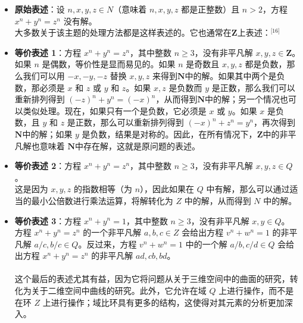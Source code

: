 \begin{itemize}
\item \textbf{原始表述}：设 \( n, x, y, z \in N \)（意味着 \( n, x, y, z \) 都是正整数）且 \( n > 2 \)，方程 \( x^n + y^n = z^n \) 没有解。\\  
大多数关于该主题的处理方法都是这样表述的。它也通常在\( \mathbf{Z} \)上表述：\(^\text{[16]}\)
\item \textbf{等价表述 1}：方程 \( x^n + y^n = z^n \)，其中整数 \( n \geq 3 \)，没有非平凡解 \( x, y, z \in \mathbf{Z} \)。\\  
如果 \( n \) 是偶数，等价性是显而易见的。如果 \( n \) 是奇数且 \( x, y, z \) 都是负数，那么我们可以用 \( -x, -y, -z \) 替换 \( x, y, z \) 来得到\( \mathbf{N} \)中的解。如果其中两个是负数，那必须是 \( x \) 和 \( z \) 或 \( y \) 和 \( z \)。如果 \( x, z \) 是负数而 \( y \) 是正数，那么我们可以重新排列得到 \( (-z)^n + y^n = (-x)^n \)，从而得到\( \mathbf{N} \)中的解；另一个情况也可以类似处理。现在，如果只有一个是负数，它必须是 \( x \) 或 \( y \)。如果 \( x \) 是负数，且 \( y \) 和 \( z \) 是正数，那么可以重新排列得到 \( (-x)^n + z^n = y^n \)，再次得到\( \mathbf{N} \)中的解；如果 \( y \) 是负数，结果是对称的。因此，在所有情况下，\( \mathbf{Z} \)中的非平凡解也意味着 \( \mathbf{N} \)中存在解，这就是原问题的表述。
\item \textbf{等价表述 2}：方程 \( x^n + y^n = z^n \)，其中整数 \( n \geq 3 \)，没有非平凡解 \( x, y, z \in Q \)。\\ 
这是因为 \( x, y, z \) 的指数相等（为 \( n \)），因此如果在 \( Q \) 中有解，那么可以通过适当的最小公倍数进行乘法运算，将解转化为 \( Z \) 中的解，从而得到 \( N \) 中的解。
\item \textbf{等价表述 3}：方程 \( x^n + y^n = 1 \)，其中整数 \( n \geq 3 \)，没有非平凡解 \( x, y \in Q \)。\\  
方程 \( x^n + y^n = z^n \) 的一个非平凡解 \( a, b, c \in Z \) 会给出方程 \( v^n + w^n = 1 \) 的非平凡解 \( a/c, b/c \in Q \)。反过来，方程 \( v^n + w^n = 1 \) 中的一个解 \( a/b, c/d \in Q \) 会给出方程 \( x^n + y^n = z^n \) 的非平凡解 \( ad, cb, bd \)。\\\\
这个最后的表述尤其有益，因为它将问题从关于三维空间中的曲面的研究，转化为关于二维空间中曲线的研究。此外，它允许在域 \( Q \) 上进行操作，而不是在环 \( Z \) 上进行操作；域比环具有更多的结构，这使得对其元素的分析更加深入。
\end{itemize}